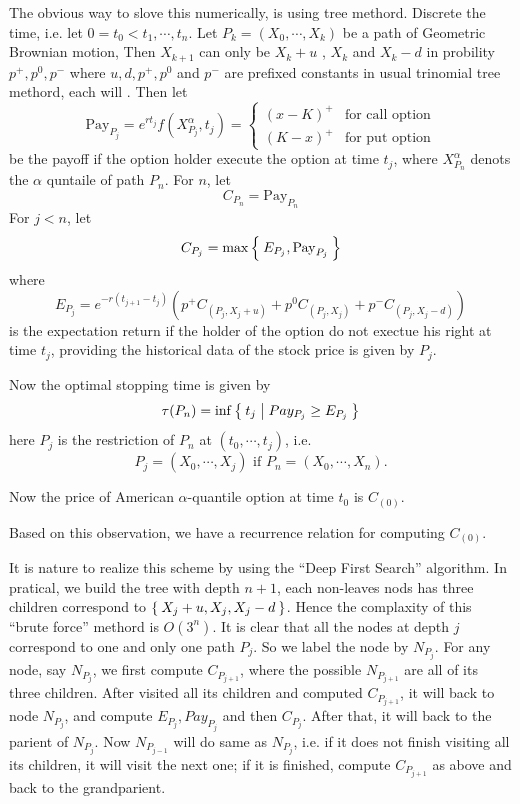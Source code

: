 \documentclass[12pt,oneside,titlepage]{book}
\begin{document}
The obvious way to slove this numerically, is using tree methord. 
Discrete the time, i.e. let $0=t_0< t_1, \cdots, t_n$.
Let $P_k=(X_0, \cdots, X_k)$ be a path of Geometric Brownian motion, 
Then $X_{k+1}$ can only be $X_{k}+u$ , $X_k$ and $X_{k}-d$ in probility
$p^+,p^0,p^-$  where $u,d,p^+,p^0$ and $p^-$ are prefixed 
constants in usual trinomial tree methord, each will .
Then let 
\[
\mathrm{Pay}_{P_j} = e^{rt_j}f(X_{P_j}^\alpha, t_j)=
\begin{cases}
(x-K)^+ & \text{for call option}\\
(K-x)^+ & \text{for put option}
\end{cases}
\] 
be the payoff if the option holder execute the option at time $t_j$, 
where $X_{P_n}^\alpha$ denots the $\alpha$ quntaile of path $P_n$. 
For $n$, let 
\[
C_{P_n} = \mathrm{Pay}_{P_n}
\]
For $j< n$, 
let 
\[
C_{P_j} = \max\Set{E_{P_j}, \mathrm{Pay}_{P_j}}
\]
where
\[
E_{P_j} = e^{-r(t_{j+1}-t_j)}(p^+C_{(P_j,X_j+u)} + p^0C_{(P_j,X_j)}+ p^-C_{(P_j,X_j-d)})
\]
is the expectation return if the holder of the option
do not exectue his right at time $t_j$, providing the historical data of 
the stock price is given by $P_j$. 

Now the optimal stopping time is given by 
\[
\tau(P_n) = \inf\Set{t_j| Pay_{P_j}\geq E_{P_j}}
\]
here $P_j$ is the restriction of $P_n$ at $(t_0, \cdots, t_j)$, i.e. 
\[
P_j = (X_0, \cdots, X_j) \text{ if } P_n=(X_0, \cdots, X_n). 
\] 

Now the price of American $\alpha$-quantile option at time $t_0$ is $C_{(0)}$.

Based on this observation, we have a recurrence relation for computing $C_{(0)}$.

It is nature to realize this scheme by using the ``Deep First Search'' algorithm.  In pratical, we build the tree with depth $n+1$, each non-leaves nods has three children correspond to $\Set{X_j+u,X_j, X_j-d}$. Hence the complaxity of this  ``brute force'' methord is $O(3^n)$. It is clear that all the nodes at depth $j$ correspond to one and only one path $P_j$. So we label the node by $N_{P_j}$.  For any node, say $N_{P_j}$, we first compute $C_{P_{j+1}}$, where the possible $N_{P_{j+1}}$ are all of its three children. 
After visited all its children and computed $C_{P_{j+1}}$, it will back to 
node $N_{P_j}$, and compute $E_{P_j}, Pay_{P_j}$ and then $C_{P_j}$. After that, 
it will back to the parient of $N_{P_j}$. Now $N_{P_{j-1}}$ will do same as 
$N_{P_{j}}$, i.e. if it does not finish visiting all its children,
 it will visit the next one; if it is finished, compute $C_{P_{j+1}}$ as above 
and back to the grandparient. 
\end{document}
